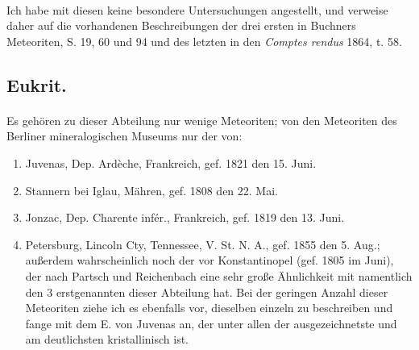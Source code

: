 \documentclass[a4paper, 11pt, oneside]{article}
\begin{document}
\paragraph{}
Ich habe mit diesen keine besondere Untersuchungen angestellt, und verweise daher auf die vorhandenen Beschreibungen der drei ersten in Buchners Meteoriten, S. 19, 60 und 94 und des letzten in den \emph{Comptes rendus} 1864, t. 58.
\subsection{Eukrit.}
\paragraph{}
Es gehören zu dieser Abteilung nur wenige Meteoriten; von den Meteoriten des Berliner mineralogischen Museums nur der von:
\begin{enumerate}
    \item Juvenas, Dep. Ardèche, Frankreich, gef. 1821 den 15. Juni.
    \item Stannern bei Iglau, Mähren, gef. 1808 den 22. Mai.
    \item Jonzac, Dep. Charente infér., Frankreich, gef. 1819 den 13. Juni.
    \item Petersburg, Lincoln Cty, Tennessee, V. St. N. A., gef. 1855 den 5. Aug.; außerdem wahrscheinlich noch der vor Konstantinopel (gef. 1805 im Juni), der nach Partsch und Reichenbach eine sehr große Ähnlichkeit mit namentlich den 3 erstgenannten dieser Abteilung hat. Bei der geringen Anzahl dieser Meteoriten ziehe ich es ebenfalls vor, dieselben einzeln zu beschreiben und fange mit dem E. von Juvenas an, der unter allen der ausgezeichnetste und am deutlichsten kristallinisch ist.
\end{enumerate}
\end{document}
